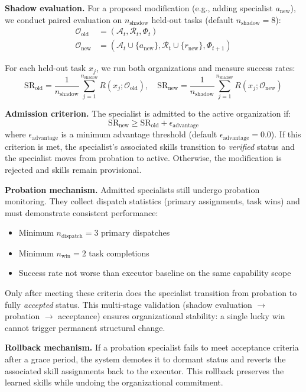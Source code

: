 \textbf{Shadow evaluation.} For a proposed modification (e.g., adding specialist $a_{\text{new}}$), we conduct paired evaluation on $n_{\text{shadow}}$ held-out tasks (default $n_{\text{shadow}} = 8$):
\begin{align}
    \mathcal{O}_{\text{old}} &= (\mathcal{A}_t, \mathcal{R}_t, \Phi_t) \\
    \mathcal{O}_{\text{new}} &= (\mathcal{A}_t \cup \{a_{\text{new}}\}, \mathcal{R}_t \cup \{r_{\text{new}}\}, \Phi_{t+1})
\end{align}

For each held-out task $x_j$, we run both organizations and measure success rates:
\begin{equation}
    \text{SR}_{\text{old}} = \frac{1}{n_{\text{shadow}}}\sum_{j=1}^{n_{\text{shadow}}} R(x_j; \mathcal{O}_{\text{old}}), \quad
    \text{SR}_{\text{new}} = \frac{1}{n_{\text{shadow}}}\sum_{j=1}^{n_{\text{shadow}}} R(x_j; \mathcal{O}_{\text{new}})
\end{equation}

\textbf{Admission criterion.} The specialist is admitted to the active organization if:
\begin{equation}
    \text{SR}_{\text{new}} \geq \text{SR}_{\text{old}} + \epsilon_{\text{advantage}}
\end{equation}
where $\epsilon_{\text{advantage}}$ is a minimum advantage threshold (default $\epsilon_{\text{advantage}} = 0.0$). If this criterion is met, the specialist's associated skills transition to \emph{verified} status and the specialist moves from probation to active. Otherwise, the modification is rejected and skills remain provisional.

\textbf{Probation mechanism.} Admitted specialists still undergo probation monitoring. They collect dispatch statistics (primary assignments, task wins) and must demonstrate consistent performance:
\begin{itemize}
    \item Minimum $n_{\text{dispatch}} = 3$ primary dispatches
    \item Minimum $n_{\text{win}} = 2$ task completions
    \item Success rate not worse than executor baseline on the same capability scope
\end{itemize}

Only after meeting these criteria does the specialist transition from probation to fully \emph{accepted} status. This multi-stage validation (shadow evaluation $\rightarrow$ probation $\rightarrow$ acceptance) ensures organizational stability: a single lucky win cannot trigger permanent structural change.

\textbf{Rollback mechanism.} If a probation specialist fails to meet acceptance criteria after a grace period, the system demotes it to dormant status and reverts the associated skill assignments back to the executor. This rollback preserves the learned skills while undoing the organizational commitment.
